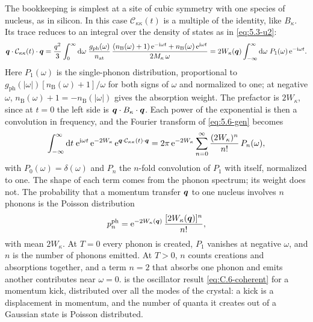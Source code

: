 The bookkeeping is simplest at a site of cubic symmetry with one species of nucleus, as in silicon. In this case $\mathcal{C}_{\kappa\kappa}(t)$ is a multiple of the identity, like $B_\kappa$. Its trace reduces to an integral over the density of states as in \cref{eq:5.3-u2}:
\begin{equation*}
  \bm{q}\cdot\mathcal{C}_{\kappa\kappa}(t)\cdot\bm{q} = \frac{q^2}{3}\int_0^\infty\mathrm{d}\omega\;\frac{g_{\mathrm{ph}}(\omega)}{n_{\mathrm{at}}}\,\frac{(n_{\mathrm{B}}(\omega) + 1)\,\mathrm{e}^{-\mathrm{i}\omega t} + n_{\mathrm{B}}(\omega)\,\mathrm{e}^{\mathrm{i}\omega t}}{2M_\kappa\,\omega}
  = 2W_\kappa(\bm{q})\int_{-\infty}^{\infty}\mathrm{d}\omega\;P_1(\omega)\,\mathrm{e}^{-\mathrm{i}\omega t} .
\end{equation*}
Here $P_1(\omega)$ is the single-phonon distribution, proportional to $g_{\mathrm{ph}}(|\omega|)[n_{\mathrm{B}}(\omega) + 1]/\omega$ for both signs of $\omega$ and normalized to one; at negative $\omega$, $n_{\mathrm{B}}(\omega) + 1 = -n_{\mathrm{B}}(|\omega|)$ gives the absorption weight. The prefactor is $2W_\kappa$, since at $t = 0$ the left side is $\bm{q}\cdot B_\kappa\cdot\bm{q}$. Each power of the exponential is then a convolution in frequency, and the Fourier transform of \cref{eq:5.6-gen} becomes
\begin{equation}
  \int_{-\infty}^{\infty}\mathrm{d} t\;\mathrm{e}^{\mathrm{i}\omega t}\,\mathrm{e}^{-2W_\kappa}\,\mathrm{e}^{\bm{q}\cdot\mathcal{C}_{\kappa\kappa}(t)\cdot\bm{q}}
  = 2\pi\,\mathrm{e}^{-2W_\kappa}\sum_{n=0}^{\infty}\frac{(2W_\kappa)^n}{n!}\,P_n(\omega) ,
  \label{eq:5.6-multi}
\end{equation}
with $P_0(\omega) = \delta(\omega)$ and $P_n$ the $n$-fold convolution of $P_1$ with itself, normalized to one. The shape of each term comes from the phonon spectrum; its weight does not. The probability that a momentum transfer $\bm{q}$ to one nucleus involves $n$ phonons is the Poisson distribution
\begin{equation}
  p^{\mathrm{ph}}_n = \mathrm{e}^{-2W_\kappa(\bm{q})}\,\frac{[2W_\kappa(\bm{q})]^n}{n!} ,
  \label{eq:5.6-poisson}
\end{equation}
with mean $2W_\kappa$. At $T = 0$ every phonon is created, $P_1$ vanishes at negative $\omega$, and $n$ is the number of phonons emitted. At $T > 0$, $n$ counts creations and absorptions together, and a term $n = 2$ that absorbs one phonon and emits another contributes near $\omega = 0$.  is the oscillator result \cref{eq:C.6-coherent} for a momentum kick, distributed over all the modes of the crystal: a kick is a displacement in momentum, and the number of quanta it creates out of a Gaussian state is Poisson distributed.

